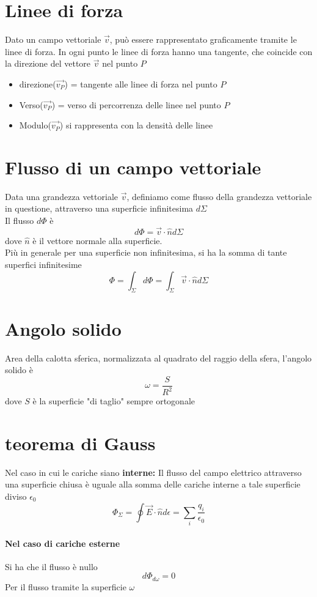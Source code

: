 \documentclass[a4paper]{report}
\begin{document}
  \section{Linee di forza}
  Dato un campo vettoriale $\vec{v}$, può essere rappresentato graficamente tramite le linee di forza. In ogni punto le linee di forza hanno una tangente, che coincide con la direzione del vettore $\vec{v}$ nel punto $P$
  \begin{itemize}
    \item direzione($\vec{v_P}$) = tangente alle linee di forza nel punto $P$
    \item Verso($\vec{v_P}$) = verso di percorrenza delle linee nel punto $P$
    \item Modulo($\vec{v_P}$) si rappresenta con la densità delle linee
  \end{itemize}

  \section{Flusso di un campo vettoriale}
  Data una grandezza vettoriale $\vec{v}$,  definiamo come flusso della grandezza vettoriale in questione, attraverso una superficie infinitesima $d \Sigma$\\
  Il flusso $d \Phi$ è
  $$ d \Phi = \vec{v}\cdot \hat{n} d \Sigma $$
  dove $\hat{n}$ è il vettore normale alla superficie.\\
  Più in generale per una superficie non infinitesima, si ha la somma di tante superfici infinitesime
  $$ \Phi = \int_\Sigma d\Phi = \int_\Sigma \vec{v} \cdot \hat{n} d\Sigma $$

  \section{Angolo solido}
  Area della calotta sferica, normalizzata al quadrato del raggio della sfera, l'angolo solido è
  $$ \omega = \frac{S}{R^2} $$
  dove $S$ è la superficie "di taglio" sempre ortogonale

  \section{teorema di Gauss}
  Nel caso in cui le cariche siano \textbf{interne:}
  Il flusso del campo elettrico attraverso una superficie chiusa è uguale alla somma delle cariche interne a tale superficie diviso $\epsilon_0$
  $$ \Phi_{\Sigma} = \oint \vec{E} \cdot \hat{n} d\epsilon = \sum_i \frac{q_i}{\epsilon_0} $$
  \paragraph{Nel caso di cariche esterne}
  Si ha che il flusso è nullo
  $$ d\Phi_{d\omega} = 0$$
  Per il flusso tramite la superficie $\omega$
\end{document}
